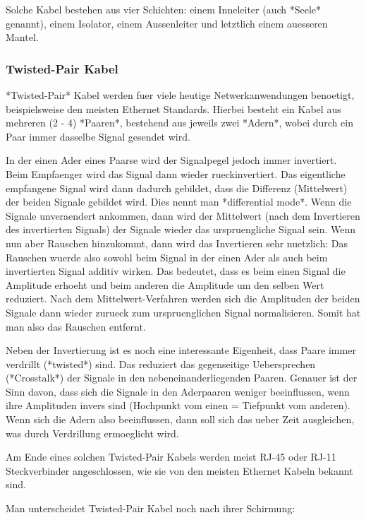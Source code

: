 Solche Kabel bestehen aus vier Schichten: einem Inneleiter (auch *Seele*
genannt), einem Isolator, einem Aussenleiter und letztlich einem auesseren
Mantel.

\subsubsection{ Twisted-Pair Kabel}

*Twisted-Pair* Kabel werden fuer viele heutige Netwerkanwendungen benoetigt,
 beispielsweise den meisten Ethernet Standards. Hierbei besteht ein Kabel aus
 mehreren (2 - 4) *Paaren*, bestehend aus jeweils zwei *Adern*, wobei durch ein
 Paar immer dasselbe Signal gesendet wird.

 In der einen Ader eines Paarse wird der Signalpegel jedoch immer
 invertiert. Beim Empfaenger wird das Signal dann wieder rueckinvertiert. Das
 eigentliche empfangene Signal wird dann dadurch gebildet, dass die Differenz
 (Mittelwert) der beiden Signale gebildet wird. Dies nennt man *differential
 mode*. Wenn die Signale unveraendert ankommen, dann wird der Mittelwert (nach dem Invertieren des invertierten Signals) der
 Signale wieder das urspruengliche Signal sein. Wenn nun aber Rauschen
 hinzukommt, dann wird das Invertieren sehr nuetzlich: Das Rauschen wuerde also
 sowohl beim Signal in der einen Ader als auch beim invertierten Signal additiv
 wirken. Das bedeutet, dass es beim einen Signal die Amplitude erhoeht und beim
 anderen die Amplitude um den selben Wert reduziert. Nach dem
 Mittelwert-Verfahren werden sich die Amplituden der beiden Signale dann wieder
 zurueck zum urspruenglichen Signal normalisieren. Somit hat man also das
 Rauschen entfernt.

 Neben der Invertierung ist es noch eine interessante Eigenheit, dass Paare
 immer verdrillt (*twisted*) sind. Das reduziert das gegenseitige Uebersprechen
 (*Crosstalk*) der Signale in den nebeneinanderliegenden Paaren. Genauer ist der
 Sinn davon, dass sich die Signale in den Aderpaaren weniger beeinflussen, wenn
 ihre Amplituden invers sind (Hochpunkt vom einen = Tiefpunkt vom anderen). Wenn
 sich die Adern also beeinflussen, dann soll sich das ueber Zeit ausgleichen,
 was durch Verdrillung ermoeglicht wird.

 Am Ende eines solchen Twisted-Pair Kabels werden meist RJ-45 oder RJ-11
 Steckverbinder angeschlossen, wie sie von den meisten Ethernet Kabeln bekannt
 sind.

Man unterscheidet Twisted-Pair Kabel noch nach ihrer Schirmung:

